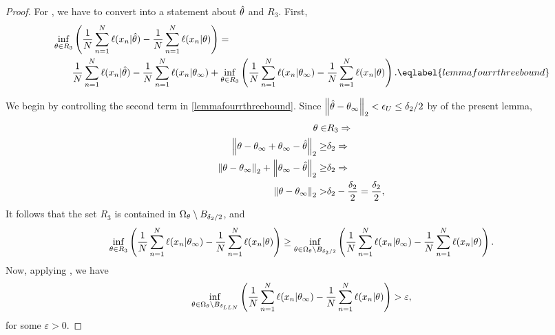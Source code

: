 \begin{lem}
\begin{proof}
For , we have to convert 
 into a statement about $\hat\theta$ and $R_3$.  First,
%
\begin{align}
\MoveEqLeft
\inf_{\theta \in R_3}
\left( \frac{1}{N} \sumn \ell(\x_n \vert \thetahat) -
       \frac{1}{N} \sumn \ell(\x_n \vert \theta)
\right)
= \nonumber \\&
\frac{1}{N} \sumn \ell(\x_n \vert \thetahat) -
       \frac{1}{N} \sumn \ell(\x_n \vert \thetatrue)
 + \inf_{\theta \in R_3}
    \left( \frac{1}{N} \sumn \ell(\x_n \vert \thetatrue) -
        \frac{1}{N} \sumn \ell(\x_n \vert \theta)
    \right).
    \eqlabel{lemmafourrthreebound}
\end{align}
%

We begin by controlling the second term in
\eqref{lemmafourrthreebound}.
Since $\left\Vert \hat\theta - \theta_{\infty}\right\Vert_2 < \epsilon_U \le \delta_2 / 2$ by
 of the present lemma,
%
\begin{align*}
%
\theta \in& R_3 \Rightarrow\\
\norm{\theta - \thetatrue + \thetatrue - \thetahat}_2 \ge & \delta_2 \Rightarrow\\
\norm{\theta - \thetatrue}_2 + \norm{\thetatrue - \thetahat}_2
    \ge& \delta_2 \Rightarrow\\
\norm{\theta - \thetatrue}_2 >& \delta_2 - \frac{\delta_2}{2} = \frac{\delta_2}{2},
%
\end{align*}
%
It follows that the set $R_3$ is contained in
$\Omega_\theta \setminus B_{\delta_2 / 2}$, and
$$
\inf_{\theta \in R_3}
    \left( \frac{1}{N} \sum_{n=1}^N \ell(x_n \vert \theta_{\infty}) -
        \frac{1}{N} \sum_{n=1}^N \ell(x_n \vert \theta)
    \right) \ge
\inf_{\theta \in \Omega_\theta \setminus B_{\delta_2 / 2}}
    \left( \frac{1}{N} \sum_{n=1}^N \ell(x_n \vert \theta_{\infty}) -
        \frac{1}{N} \sum_{n=1}^N \ell(x_n \vert \theta)
    \right).
$$
Now, applying  , we have
$$
\inf_{\theta \in \Omega_\theta \setminus B_{\delta_{LLN}}}
    \left( \frac{1}{N} \sum_{n=1}^N \ell(x_n \vert \theta_{\infty}) -
        \frac{1}{N} \sum_{n=1}^N \ell(x_n \vert \theta)
    \right) > \varepsilon,
$$
for some $\varepsilon > 0$.


\end{proof}
\end{lem}
